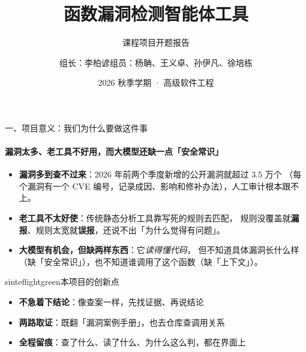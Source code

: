 \documentclass{beamer}
\title{函数漏洞检测智能体工具}
\subtitle{课程项目开题报告}
\author{组长：李柏谚\quad 组员：杨聃、王义卓、孙伊凡、徐培栋}
\date{2026 秋季学期 · 高级软件工程}
\begin{document}
\maketitle

\begin{frame}{一、项目意义：我们为什么要做这件事}
\framesubtitle{漏洞太多、老工具不好用，而大模型还缺一点「安全常识」}
\small
\begin{itemize}
\item \textbf{漏洞多到查不过来}：2026 年前两个季度新增的公开漏洞就超过 \alert{3.5 万个}
      （每个漏洞有一个 CVE 编号，记录成因、影响和修补办法），人工审计根本跟不上。
\item \textbf{老工具不太好使}：传统静态分析工具靠写死的规则去匹配，
      规则没覆盖就\textbf{漏报}、规则太宽就\textbf{误报}，还说不出「为什么觉得有问题」。
\item \textbf{大模型有机会，但缺两样东西}：它\emph{读得懂代码}，
      但不知道具体漏洞长什么样（缺「安全常识」），也不知道谁调用了这个函数（缺「上下文」）。
\end{itemize}
\begin{colorblock}[black]{sinteflightgreen}{本项目的创新点}
\begin{itemize}
\item \textbf{不急着下结论}：像查案一样，先找证据、再说结论
\item \textbf{两路取证}：既翻「漏洞案例手册」，也去仓库查调用关系
\item \textbf{全程留痕}：查了什么、读了什么、为什么这么判，都在界面上
\end{itemize}
\end{colorblock}
\end{frame}
\end{document}
